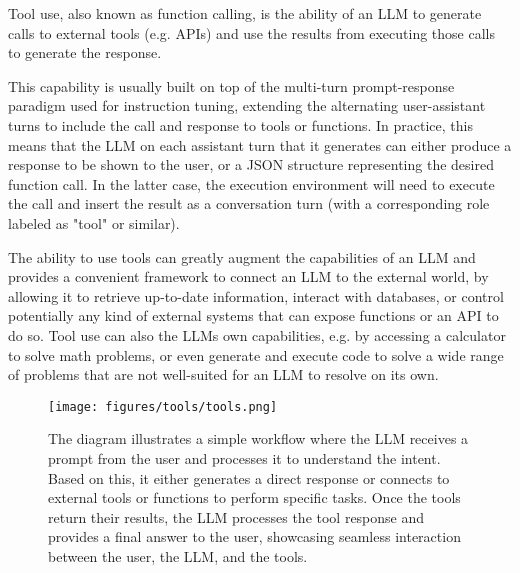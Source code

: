 Tool use, also known as function calling, is the ability of an LLM to generate calls to external tools (e.g. APIs) and use the results from executing those calls to generate the response.

This capability is usually built on top of the multi-turn prompt-response paradigm used for instruction tuning, extending the alternating user-assistant turns to include the call and response to tools or functions. In practice, this means that the LLM on each assistant turn that it generates can either produce a response to be shown to the user, or a JSON structure representing the desired function call. In the latter case, the execution environment will need to execute the call and insert the result as a conversation turn (with a corresponding role labeled as "tool" or similar).

The ability to use tools can greatly augment the capabilities of an LLM and provides a convenient framework to connect an LLM to the external world, by allowing it to retrieve up-to-date information, interact with databases, or control potentially any kind of external systems that can expose functions or an API to do so. Tool use can also the LLMs own capabilities, e.g. by accessing a calculator to solve math problems, or even generate and execute code to solve a wide range of problems that are not well-suited for an LLM to resolve on its own.

\begin{figure}[htbp]
    \centering
    \texttt{[image: figures/tools/tools.png]}
    \caption{The diagram illustrates a simple workflow where the LLM receives a prompt from the user and processes it to understand the intent. Based on this, it either generates a direct response or connects to external tools or functions to perform specific tasks. Once the tools return their results, the LLM processes the tool response and provides a final answer to the user, showcasing seamless interaction between the user, the LLM, and the tools.}
    \label{fig:tool-usage"}
\end{figure}

